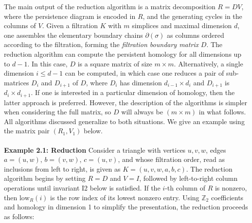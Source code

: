\documentclass{siamart190516}
\begin{document}
 The main output of the reduction algorithm is a matrix decomposition $R = D V$, where the persistence diagram is encoded in $R$, and the generating cycles in the columns of $V$. 
 Given a  filtration $K$ with $m$ simplices and maximal dimension $d$, 
 one assembles the elementary boundary chains $\partial(\sigma)$ as columns ordered according to the filtration, forming the \emph{filtration boundary matrix} $D$. 
 The reduction algorithm can  compute the persistent homology for all dimensions up to $d - 1$.
 In this case,  $D$ is a square matrix of size $m \times m$. Alternatively, a single dimension $i \leq d - 1$ can be computed, in which case one reduces a pair of sub-matrices  $D_i$ and $ D_{i+1}$ of $D$,  where $D_i$ has dimension $d_{i-1} \times d_i$ and $D_{i+1}$ is  $d_{i} \times d_{i+1}$. 
 If one is interested in a particular dimension of homology, then the latter approach is preferred. However, the  description of the algorithms is simpler when considering the full matrix, so $D$ will always be $(m \times m)$ in what follows. 
 All algorithms discussed generalize to both situations. We give an example using the matrix pair $(R_1, V_1)$  below. 
\\
\\
\noindent
\textbf{Example 2.1: Reduction} Consider a triangle with vertices $u,v,w$, edges $a = (u,w)$, $b = (v,w)$, $c = (u, v)$,
and whose filtration order, read as inclusions from left to right, is given as $K = (u, v, w, a, b, c)$. The reduction algorithm begins by setting $R = D$ and $V = I$, followed by left-to-right column operations until invariant I2 below is satisfied.
If the $i$-th column of $R$ is nonzero, then $\mathrm{low}_R(i)$ 
is the row index of its lowest nonzero entry.
Using $\mathbb{Z}_2$ coefficients and homology in dimension 1 to simplify the presentation, the reduction proceeds as follows:
\end{document}
